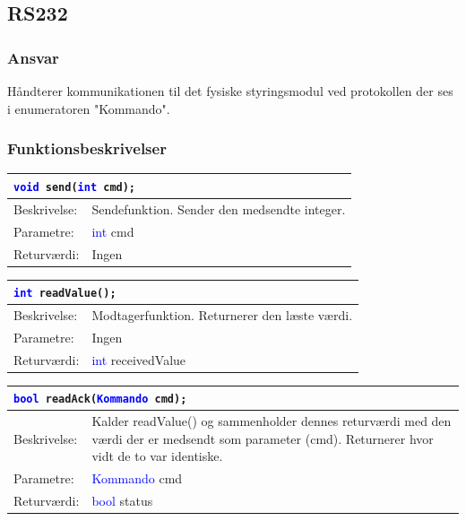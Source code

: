 \subsection{RS232}
\subsubsection{Ansvar}
Håndterer kommunikationen til det fysiske styringsmodul ved protokollen der ses i enumeratoren "Kommando". 
\subsubsection{Funktionsbeskrivelser}

\begin{table}[H]
\begin{tabular}{l p{12.5cm}}
\multicolumn{2}{l}{\texttt{\textcolor{blue}{void} send(\textcolor{blue}{int} cmd);}} \\
\hline
Beskrivelse: &Sendefunktion. Sender den medsendte integer.\\
Parametre:&\textcolor{blue}{int} cmd\\
Returværdi:&Ingen\\
\end{tabular}
\end{table}

\begin{table}[H]
\begin{tabular}{l p{12.5cm}}
\multicolumn{2}{l}{\texttt{\textcolor{blue}{int} readValue();}} \\
\hline
Beskrivelse: &Modtagerfunktion. Returnerer den læste værdi.\\
Parametre:&Ingen\\
Returværdi:&\textcolor{blue}{int} receivedValue\\
\end{tabular}
\end{table}

\begin{table}[H]
\begin{tabular}{l p{12.5cm}}
\multicolumn{2}{l}{\texttt{\textcolor{blue}{bool} readAck(\textcolor{blue}{Kommando} cmd);}} \\
\hline
Beskrivelse: &Kalder readValue() og sammenholder dennes returværdi med den værdi der er medsendt som parameter (cmd). Returnerer hvor vidt de to var identiske.\\
Parametre:&\textcolor{blue}{Kommando} cmd\\
Returværdi:&\textcolor{blue}{bool} status\\
\end{tabular}
\end{table}

